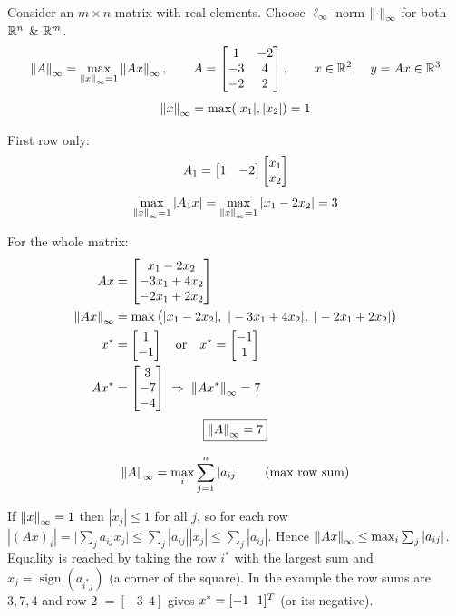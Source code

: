 \begin{example}
Consider an $m\times n$ matrix with real elements. Choose $\ell_\infty$-norm $\left\lVert \cdot \right\rVert_\infty$ for both $\mathbb{R}^n$ \& $\mathbb{R}^m$.
\[
\left\lVert A \right\rVert_\infty = \max_{\left\lVert x \right\rVert_\infty=1} \left\lVert Ax \right\rVert_\infty,
\qquad
A = \begin{bmatrix}1 & -2\\ -3 & 4\\ -2 & 2\end{bmatrix},
\qquad x\in\mathbb{R}^2,\quad y = Ax \in \mathbb{R}^3
\]
\[
\left\lVert x \right\rVert_\infty = \max(|x_1|,|x_2|) = 1
\]
\begin{center}
\begin{minipage}{0.4\textwidth}
\centering
{}
\end{minipage}%
\begin{minipage}{0.55\textwidth}
First row only:
\[
A_1 = \begin{bmatrix}1 & -2\end{bmatrix}\begin{bmatrix}x_1\\ x_2\end{bmatrix}
\]
\[
\max_{\left\lVert x \right\rVert_\infty=1} |A_1 x| = \max_{\left\lVert x \right\rVert_\infty=1} |x_1 - 2x_2| = 3
\]
\end{minipage}
\end{center}
For the whole matrix:
\begin{align*}
Ax &= \bmat{x_1 - 2x_2\\ -3x_1 + 4x_2\\ -2x_1 + 2x_2}\\
\norm{Ax}_\infty &= \max\big(|x_1 - 2x_2|,\ |-3x_1+4x_2|,\ |-2x_1+2x_2|\big)\\
x^* &= \bmat{1\\ -1} \quad\text{or}\quad x^* = \bmat{-1\\ 1}\\
Ax^* &= \bmat{3\\ -7\\ -4} \;\Rightarrow\; \norm{Ax^*}_\infty = 7
\end{align*}
\[
\boxed{\left\lVert A \right\rVert_\infty = 7}
\]
\end{example}
\begin{keybox}
\[
\left\lVert A \right\rVert_\infty = \max_i \sum_{j=1}^n |a_{ij}| \qquad \text{(max row sum)}
\]
\end{keybox}
\begin{insight}
If $\left\lVert x \right\rVert_\infty = 1$ then $|x_j|\le 1$ for all $j$, so for each row
$|(Ax)_i| = \big|\sum_j a_{ij}x_j\big| \le \sum_j |a_{ij}||x_j| \le \sum_j |a_{ij}|$.
Hence $\left\lVert Ax \right\rVert_\infty\le\max_i\sum_j|a_{ij}|$. Equality is reached by taking the row $i^*$ with the largest sum and $x_j = \operatorname{sign}(a_{i^*j})$ (a corner of the square). In the example the row sums are $3,7,4$ and row 2 $= [-3\ \ 4]$ gives $x^* = [-1\ \ 1]^{T}$ (or its negative).
\end{insight}

